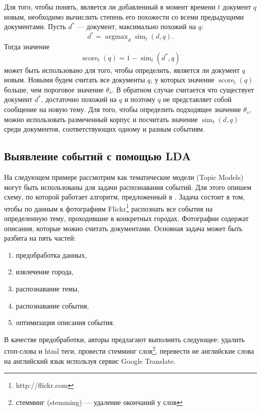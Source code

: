\documentclass[12pt, a4paper]{article}
\DeclareMathOperator*{\argmax}{argmax}
\DeclareMathOperator{\score}{score}
\DeclareMathOperator{\simu}{sim}
\begin{document}
	Для того, чтобы понять, является ли добавленный в момент времени $t$ документ $q$ новым, необходимо вычислить степень его похожести со всеми предыдущими документами. Пусть $d^*$ --- документ, максимально похожий на $q$:
	\begin{equation}
	d^* = \argmax_d \simu_t (d,q).
	\end{equation}
	Тогда значение
	\begin{equation}
	\score_t(q) = 1 - \simu_t (d^*, q)
	\end{equation}
	может быть использовано для того, чтобы определить, является ли документ $q$ новым. Новыми будем считать все документы $q$, у которых значение $\score_t(q)$ больше, чем пороговое значение $\theta_s$. В обратном случае считается что существует документ $d^*$, достаточно похожий на $q$ и поэтому $q$ не представляет собой сообщение на новую тему. Для того, чтобы определить подходящее значение $\theta_s$, можно использовать размеченный корпус и посчитать значение $\simu_t (d,q)$ среди документов, соответствующих одному и разным событиям.
	
	\subsection{Выявление событий с помощью LDA}
  На следующем примере рассмотрим как тематические модели (Topic Models) могут быть использованы для задачи распознавания событий. Для этого опишем схему, по которой работает алгоритм, предложенный в \cite{mediaeval}. Задача состоит в том, чтобы по данным к фотографиям Flickr\footnote{http://flickr.com} распознать все события на определенную тему, проходившие в конкретных городах. Фотографии содержат описания, которые можно считать документами. Основная задача может быть разбита на пять частей: 
  \begin{enumerate}
  \item предобработка данных,
  \item извлечение города,
  \item распознавание темы,
  \item распознавание события,
  \item оптимизация описания события.
  \end{enumerate}
  
  В качестве предобработки, авторы предлагают выполнить следующее: удалить стоп-слова и html теги, провести стемминг слов\footnote{стемминг (stemming) --- удаление окончаний у слов}, перевести не английские слова на английский язык используя сервис Google Translate.
  
\end{document}
